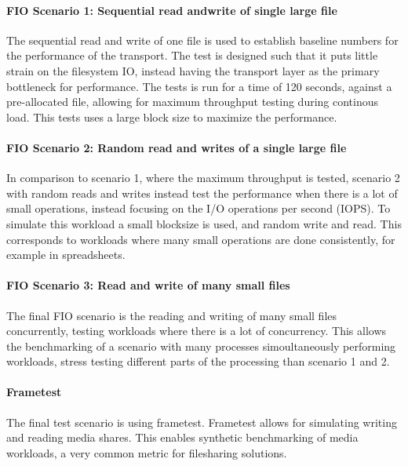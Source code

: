 \documentclass[english, 12pt, a4paper, elec, utf8, a-2b, online]{aaltothesis}
\begin{document}
\paragraph{FIO Scenario 1: Sequential read andwrite of single large file}

The sequential read and write of one file is used to establish baseline numbers
for the performance of the transport. The test is designed such that it puts little
strain on the filesystem IO, instead having the transport layer as the primary 
bottleneck for performance. The tests is run for a time of 120 seconds, against a
pre-allocated file, allowing for maximum throughput testing during continous load.
This tests uses a large block size to maximize the performance.

\paragraph{FIO Scenario 2: Random read and writes of a single large file}

In comparison to scenario 1, where the maximum throughput is tested, scenario 2
with random reads and writes instead test the performance when there is a lot of
small operations, instead focusing on the I/O operations per second (IOPS). To simulate
this workload a small blocksize is used, and random write and read. This corresponds
to workloads where many small operations are done consistently, for example in
spreadsheets.

\paragraph{FIO Scenario 3: Read and write of many small files}

The final FIO scenario is the reading and writing of many small files concurrently,
testing workloads where there is a lot of concurrency. This allows the benchmarking
of a scenario with many processes simoultaneously performing workloads, stress
testing different parts of the processing than scenario 1 and 2.

\paragraph{Frametest}

The final test scenario is using frametest. Frametest allows for simulating
writing and reading media shares. This enables synthetic benchmarking of media
workloads, a very common metric for filesharing solutions.
\end{document}

